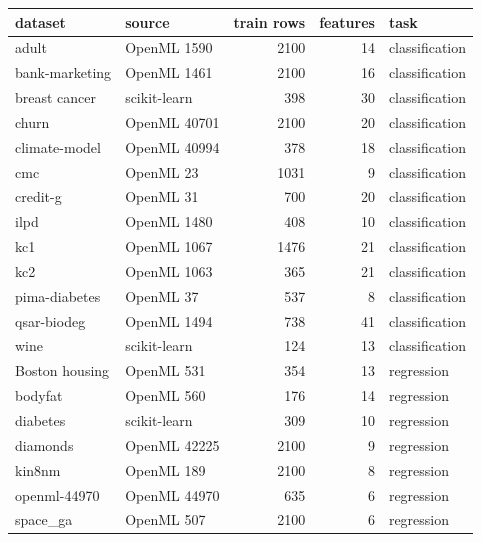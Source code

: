 \begin{tabular}{llrrl}
\toprule
dataset & source & train rows & features & task\\
\midrule
adult & OpenML 1590 & 2100 & 14 & classification\\
bank-marketing & OpenML 1461 & 2100 & 16 & classification\\
breast cancer & scikit-learn & 398 & 30 & classification\\
churn & OpenML 40701 & 2100 & 20 & classification\\
climate-model & OpenML 40994 & 378 & 18 & classification\\
cmc & OpenML 23 & 1031 & 9 & classification\\
credit-g & OpenML 31 & 700 & 20 & classification\\
ilpd & OpenML 1480 & 408 & 10 & classification\\
kc1 & OpenML 1067 & 1476 & 21 & classification\\
kc2 & OpenML 1063 & 365 & 21 & classification\\
pima-diabetes & OpenML 37 & 537 & 8 & classification\\
qsar-biodeg & OpenML 1494 & 738 & 41 & classification\\
wine & scikit-learn & 124 & 13 & classification\\
Boston housing & OpenML 531 & 354 & 13 & regression\\
bodyfat & OpenML 560 & 176 & 14 & regression\\
diabetes & scikit-learn & 309 & 10 & regression\\
diamonds & OpenML 42225 & 2100 & 9 & regression\\
kin8nm & OpenML 189 & 2100 & 8 & regression\\
openml-44970 & OpenML 44970 & 635 & 6 & regression\\
space\_ga & OpenML 507 & 2100 & 6 & regression\\
\bottomrule
\end{tabular}